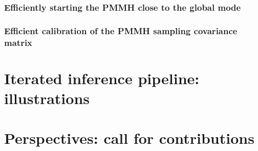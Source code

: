 \documentclass[a4paper,11pt]{article}
\begin{document}
\subsubsection{Efficiently starting the PMMH close to the global mode}
\subsubsection{Efficient calibration of the PMMH sampling covariance matrix}
\section{Iterated inference pipeline: illustrations}
\section{Perspectives: call for contributions}














 
\end{document}

